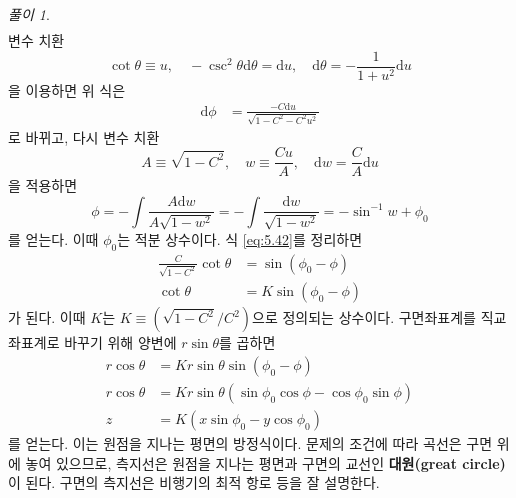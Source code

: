 \documentclass[chapter, oneside, b5paper]{oblivoir}
\theoremstyle{plain}
\theoremstyle{definition}
\theoremstyle{remark}
\newtheorem*{solution}{풀이}
\begin{document}
\begin{solution}
\begin{equation}
\begin{aligned}
    \end{aligned}
    \end{equation}
    변수 치환
    \begin{equation*}
        \cot{\theta} \equiv u, \quad -\csc^2{\theta}\mathrm{d}\theta = \mathrm{d}u, \quad \mathrm{d}\theta = -\frac{1}{1+u^2} \mathrm{d}u
    \end{equation*}
    을 이용하면 위 식은
    \begin{equation}
        \begin{aligned}
            \mathrm{d}\phi &= \frac{-C\mathrm{d}u}{\sqrt{1-C^2-C^2u^2}}
        \end{aligned}
    \end{equation}
    로 바뀌고, 다시 변수 치환
    \begin{equation*}
        A \equiv \sqrt{1-C^2}, \quad w \equiv \frac{Cu}{A}, \quad \mathrm{d}w = \frac{C}{A} \mathrm{d}u
    \end{equation*}
    을 적용하면
    \begin{equation}
        \phi = -\int \frac{A \mathrm{d}w}{A\sqrt{1-w^2}} = -\int \frac{\mathrm{d}w}{\sqrt{1-w^2}} = -\sin^{-1}{w} + \phi_0
        \label{eq:5.42}
    \end{equation}
    를 얻는다. 이때 $\phi_0$는 적분 상수이다. 식 \ref{eq:5.42}를 정리하면
    \begin{equation}
        \begin{aligned}
            \frac{C}{\sqrt{1-C^2}} \cot{\theta} &= \sin{(\phi_0 - \phi)} \\
            \cot{\theta} &= K\sin{(\phi_0 - \phi)}
        \end{aligned}
    \end{equation}
    가 된다. 이때 $K$는 $K \equiv (\sqrt{1-C^2} / C^2)$으로 정의되는 상수이다. 구면좌표계를 직교좌표계로 바꾸기 위해 양변에 $r\sin{\theta}$를 곱하면
    \begin{equation}
    \begin{aligned}
        r\cos{\theta} &= Kr\sin{\theta}\sin{(\phi_0 - \phi)} \\
        r\cos{\theta} &= Kr\sin{\theta}(\sin{\phi_0}\cos{\phi} - \cos{\phi_0}\sin{\phi}) \\
        z &= K(x\sin{\phi_0}-y\cos{\phi_0})
    \end{aligned}
    \end{equation}
    를 얻는다. 이는 원점을 지나는 평면의 방정식이다. 문제의 조건에 따라 곡선은 구면 위에 놓여 있으므로, 측지선은 원점을 지나는 평면과 구면의 교선인 \textbf{대원(great circle)}이 된다. 구면의 측지선은 비행기의 최적 항로 등을 잘 설명한다.
\end{solution}
\end{document}
